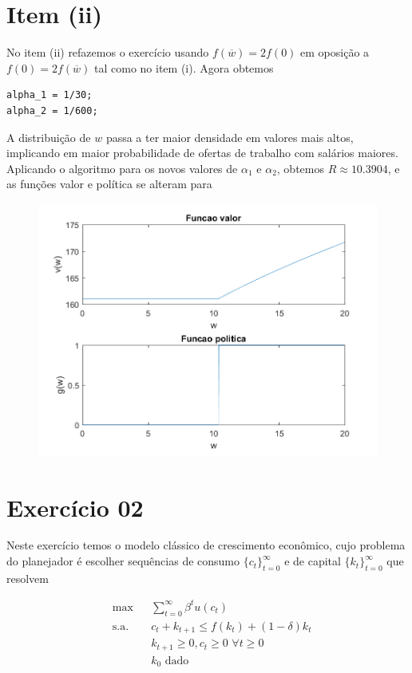 \documentclass{article}
\begin{document}
\section*{Item (ii)}

No item (ii) refazemos o exercício usando $f(\overline{w}) = 2f(0)$ em oposição a $f(0) = 2f(\overline{w})$ tal como no item (i).
Agora obtemos 

\begin{lstlisting}
alpha_1 = 1/30;
alpha_2 = 1/600;
\end{lstlisting}

A distribuição de $w$ passa a ter maior densidade em valores mais altos,
implicando em maior probabilidade de ofertas de trabalho com salários maiores.
Aplicando o algoritmo para os novos valores de  $\alpha_1$ e $\alpha_2$, 
obtemos $R \approx 10.3904$, e as funções valor e política se alteram para

\begin{figure}[!h]
  \includegraphics[scale=0.6]{ex1/ex1_2.png}
\end{figure}

\section*{Exercício 02}

Neste exercício temos o modelo clássico de crescimento econômico, cujo problema do planejador
é escolher sequências de consumo $\{c_t\}_{t=0}^{\infty}$ e de capital $\{k_t\}_{t=0}^{\infty}$ que resolvem

\begin{equation}
\begin{aligned}
& \max & & \sum_{t=0}^{\infty} \beta^t u(c_t) \\
& \text{s.a.} & &  c_t + k_{t+1} \leq f(k_t) + (1-\delta) k_t \\
& & &  k_{t+1} \geq 0, c_t \geq 0 \,\, \forall t \geq 0  \\
& & &  k_0 \text{ dado} \\
\end{aligned}
\end{equation}
\end{document}
